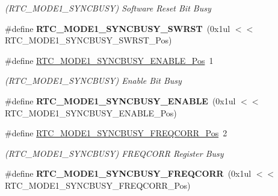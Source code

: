 \begin{DoxyCompactItemize}
\begin{DoxyCompactList}\small\item\em (R\+T\+C\+\_\+\+M\+O\+D\+E1\+\_\+\+S\+Y\+N\+C\+B\+U\+S\+Y) Software Reset Bit Busy \end{DoxyCompactList}\item 
\hypertarget{group___s_a_m_l21___r_t_c_gae996f5ef1ecd5408ac7cc7986093f3f4}{}\#define {\bfseries R\+T\+C\+\_\+\+M\+O\+D\+E1\+\_\+\+S\+Y\+N\+C\+B\+U\+S\+Y\+\_\+\+S\+W\+R\+S\+T}~(0x1ul $<$$<$ R\+T\+C\+\_\+\+M\+O\+D\+E1\+\_\+\+S\+Y\+N\+C\+B\+U\+S\+Y\+\_\+\+S\+W\+R\+S\+T\+\_\+\+Pos)\label{group___s_a_m_l21___r_t_c_gae996f5ef1ecd5408ac7cc7986093f3f4}

\item 
\hypertarget{group___s_a_m_l21___r_t_c_gadc19c8537c62424b3310f312f04ff3f6}{}\#define \hyperlink{group___s_a_m_l21___r_t_c_gadc19c8537c62424b3310f312f04ff3f6}{R\+T\+C\+\_\+\+M\+O\+D\+E1\+\_\+\+S\+Y\+N\+C\+B\+U\+S\+Y\+\_\+\+E\+N\+A\+B\+L\+E\+\_\+\+Pos}~1\label{group___s_a_m_l21___r_t_c_gadc19c8537c62424b3310f312f04ff3f6}

\begin{DoxyCompactList}\small\item\em (R\+T\+C\+\_\+\+M\+O\+D\+E1\+\_\+\+S\+Y\+N\+C\+B\+U\+S\+Y) Enable Bit Busy \end{DoxyCompactList}\item 
\hypertarget{group___s_a_m_l21___r_t_c_ga7e8290b81c9db2cf6b4eb7dd3c3df889}{}\#define {\bfseries R\+T\+C\+\_\+\+M\+O\+D\+E1\+\_\+\+S\+Y\+N\+C\+B\+U\+S\+Y\+\_\+\+E\+N\+A\+B\+L\+E}~(0x1ul $<$$<$ R\+T\+C\+\_\+\+M\+O\+D\+E1\+\_\+\+S\+Y\+N\+C\+B\+U\+S\+Y\+\_\+\+E\+N\+A\+B\+L\+E\+\_\+\+Pos)\label{group___s_a_m_l21___r_t_c_ga7e8290b81c9db2cf6b4eb7dd3c3df889}

\item 
\hypertarget{group___s_a_m_l21___r_t_c_gab51d0339efd161efb5e5bfef5625b633}{}\#define \hyperlink{group___s_a_m_l21___r_t_c_gab51d0339efd161efb5e5bfef5625b633}{R\+T\+C\+\_\+\+M\+O\+D\+E1\+\_\+\+S\+Y\+N\+C\+B\+U\+S\+Y\+\_\+\+F\+R\+E\+Q\+C\+O\+R\+R\+\_\+\+Pos}~2\label{group___s_a_m_l21___r_t_c_gab51d0339efd161efb5e5bfef5625b633}

\begin{DoxyCompactList}\small\item\em (R\+T\+C\+\_\+\+M\+O\+D\+E1\+\_\+\+S\+Y\+N\+C\+B\+U\+S\+Y) F\+R\+E\+Q\+C\+O\+R\+R Register Busy \end{DoxyCompactList}\item 
\hypertarget{group___s_a_m_l21___r_t_c_ga9f8eb0c961d116859b754da7b53c9901}{}\#define {\bfseries R\+T\+C\+\_\+\+M\+O\+D\+E1\+\_\+\+S\+Y\+N\+C\+B\+U\+S\+Y\+\_\+\+F\+R\+E\+Q\+C\+O\+R\+R}~(0x1ul $<$$<$ R\+T\+C\+\_\+\+M\+O\+D\+E1\+\_\+\+S\+Y\+N\+C\+B\+U\+S\+Y\+\_\+\+F\+R\+E\+Q\+C\+O\+R\+R\+\_\+\+Pos)\label{group___s_a_m_l21___r_t_c_ga9f8eb0c961d116859b754da7b53c9901}


\end{DoxyCompactItemize}
